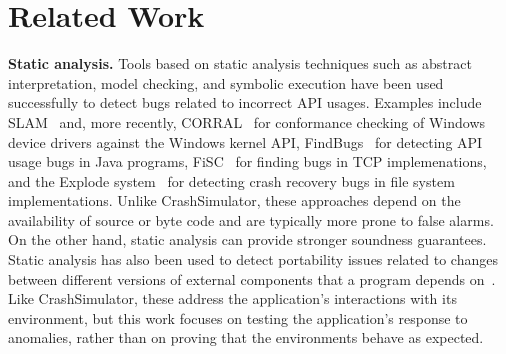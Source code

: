 \section{Related Work} \label{sec:relatedwork}

\iffalse
While there is a vast literature on test
generation~\cite{ammann2008introduction, mcminn2004search,
  puasuareanu2009survey, dias2007survey}, much less work
has focused on issues of portability and testing whether software
behaves consistently in different environments.  Prior work on
CheckAPI~\cite{rasley2015detecting} and
NetCheck~\cite{Zhuang_NSDI_2014} begins to fill this gap and this paper
builds upon those results.
%
%


Crash reproduction by test case mutation~\cite{DBLP:conf/sigsoft/XuanXM15}.

\fi


\noindent
{\bf Static analysis. }
Tools based on static analysis techniques such as abstract
interpretation, model checking, and symbolic execution have been used
successfully to detect bugs related to incorrect API usages. Examples
include SLAM~\cite{Ball_adecade, Ball:2002:SLP:503272.503274} and,
more recently, CORRAL~\cite{DBLP:conf/sigsoft/LalQ14} for conformance
checking of Windows device drivers against the Windows kernel API,
FindBugs~\cite{DBLP:conf/oopsla/HovemeyerP04} for detecting API usage
bugs in Java programs, FiSC~\cite{Musuvathi04modelchecking} for
finding bugs in TCP implemenations, and the Explode
system~\cite{Yang:2006:ELG:1298455.1298469} for detecting crash
recovery bugs in file system implementations. Unlike CrashSimulator,
these approaches depend on the availability of source or byte code and
are typically more prone to false alarms. On the other hand, static
analysis can provide stronger soundness guarantees.  Static analysis
has also been used to detect portability issues related to changes
between different versions of external components that a program
depends on~\cite{silakov2010improving, javacompliance-www}. Like
CrashSimulator, these address the application's interactions with its
environment, but this work focuses on testing the application's
response to anomalies, rather than on proving that the environments
behave as expected.

